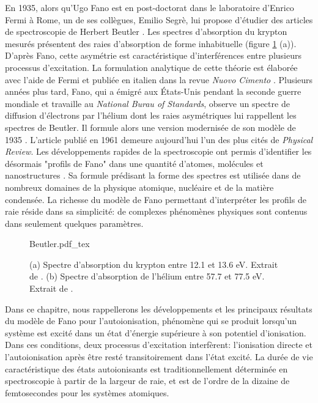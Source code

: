 En 1935, alors qu'Ugo Fano est en post-doctorat dans le laboratoire d'Enrico Fermi à Rome, un de ses collègues, Emilio Segrè, lui propose d'étudier des articles de spectroscopie de Herbert Beutler . Les spectres d'absorption du krypton mesurés présentent des raies d'absorption de forme inhabituelle (figure \ref{fig:Beutler} (a)). D'après Fano, cette asymétrie est caractéristique d'interférences entre plusieurs processus d'excitation. La formulation analytique de cette théorie est élaborée avec l'aide de Fermi et publiée en italien dans la revue \textit{Nuovo Cimento} . Plusieurs années plus tard, Fano, qui a émigré aux \'{E}tats-Unis pendant la seconde guerre mondiale et travaille au \textit{National Burau of Standards}, observe un spectre de diffusion d'électrons par l'hélium dont les raies asymétriques lui rappellent les spectres de Beutler. Il formule alors une version modernisée de son modèle de 1935 . L'article publié en 1961 demeure aujourd'hui l'un des plus cités de \textit{Physical Review}. Les développements rapides de la spectroscopie ont permis d'identifier les désormais "profils de Fano" dans une quantité d'atomes, molécules et nanostructures . Sa formule prédisant la forme des spectres est utilisée dans de nombreux domaines de la physique atomique, nucléaire et de la matière condensée. La richesse du modèle de Fano permettant d'interpréter les profils de raie réside dans sa simplicité: de complexes phénomènes physiques sont contenus dans seulement quelques paramètres.

\begin{figure}
\centering
\def\svgwidth{\textwidth}
{Beutler.pdf_tex}
\caption{(a) Spectre d'absorption du krypton entre 12.1 et 13.6 eV. Extrait de . (b) Spectre d'absorption de l'hélium entre 57.7 et 77.5 eV. Extrait de .}
\label{fig:Beutler}
\end{figure}

Dans ce chapitre, nous rappellerons les développements et les principaux résultats du modèle de Fano pour l'autoionisation, phénomène qui se produit lorsqu'un système est excité dans un état d'énergie supérieure à son potentiel d'ionisation. Dans ces conditions, deux processus d'excitation interfèrent: l'ionisation directe et l'autoionisation après être resté transitoirement dans l'état excité. La durée de vie caractéristique des états autoionisants est traditionnellement déterminée en spectroscopie à partir de la largeur de raie, et est de l'ordre de la dizaine de femtosecondes pour les systèmes atomiques.

